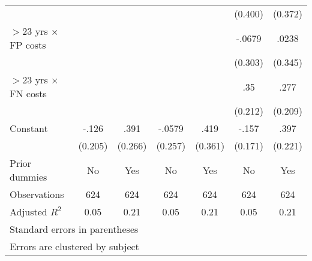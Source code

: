 \begin{table}[htbp]
\begin{tabular}{l*{6}{c}}
                &         &         &         &         &  (0.400)&  (0.372)\\
$>$23 yrs $\times$ FP costs&         &         &         &         &   -.0679&    .0238\\
                &         &         &         &         &  (0.303)&  (0.345)\\
$>$23 yrs $\times$ FN costs&         &         &         &         &      .35&     .277\\
                &         &         &         &         &  (0.212)&  (0.209)\\
Constant        &    -.126&     .391&   -.0579&     .419&    -.157&     .397\\
                &  (0.205)&  (0.266)&  (0.257)&  (0.361)&  (0.171)&  (0.221)\\
Prior dummies   &       No&      Yes&       No&      Yes&       No&      Yes\\
\hline
Observations    &      624&      624&      624&      624&      624&      624\\
Adjusted \(R^{2}\)&     0.05&     0.21&     0.05&     0.21&     0.05&     0.21\\
\hline\hline
\multicolumn{7}{l}{\footnotesize Standard errors in parentheses}\\
\multicolumn{7}{l}{\footnotesize Errors are clustered by subject}\\
\end{tabular}
\end{table}
